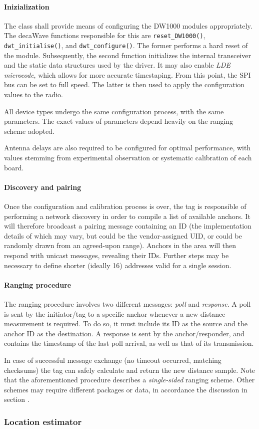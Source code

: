 \paragraph{Inizialization}
The class shall provide means of configuring the DW1000 modules appropriately.
The decaWave functions responsible for this are \texttt{reset\_DW1000()},  \texttt{dwt\_initialise()}, and \texttt{dwt\_configure()}.
The former performs a hard reset of the module.
Subsequently, the second function initializes the internal transceiver and the static data structures used by the driver.
It may also enable \emph{LDE microcode}, which allows for more accurate timestaping.
From this point, the SPI bus can be set to full speed.
The latter is then used to apply the configuration values to the radio.

All device types undergo the same configuration process, with the same parameters.
The exact values of parameters depend heavily on the ranging scheme adopted.

Antenna delays are also required to be configured for optimal performance, with values stemming from experimental observation or systematic calibration of each board.


\paragraph{Discovery and pairing}
Once the configuration and calibration process is over, the tag is responsible of performing a network discovery in order to compile a list of available anchors.
It will therefore broadcast a pairing message containing an ID (the implementation details of which may vary, but could be the vendor-assigned UID, or could be randomly drawn from an agreed-upon range).
Anchors in the area will then respond with unicast messages, revealing their IDs.
Further steps may be necessary to define shorter (ideally \SI{16}{\bit}) addresses valid for a single session.


\paragraph{Ranging procedure}
The ranging procedure involves two different messages: \emph{poll} and \emph{response}.
A poll is sent by the initiator/tag to a specific anchor whenever a new distance measurement is required.
To do so, it must include its ID as the source and the anchor ID as the destination.
A response is sent by the anchor/responder, and contains the timestamp of the last poll arrival, as well as that of its transmission.

In case of successful message exchange (no timeout occurred, matching checksums) the tag can safely calculate and return the new distance sample.
Note that the aforementioned procedure describes a \emph{single-sided} ranging scheme.
Other schemes may require different packages or data, in accordance the discussion in section .


\subsubsection{Location estimator}

